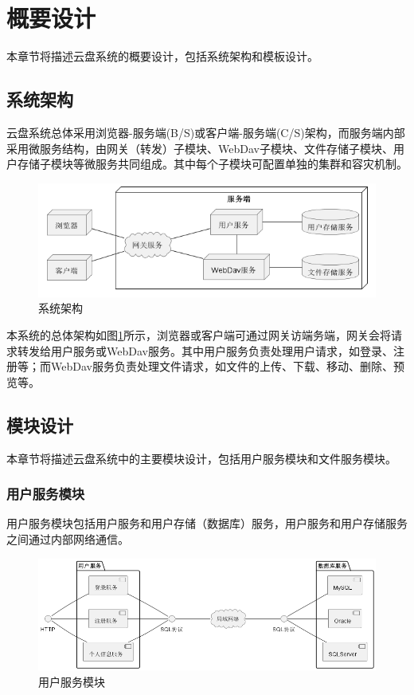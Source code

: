 \section{概要设计}

本章节将描述云盘系统的概要设计，包括系统架构和模板设计。

\subsection{系统架构}

云盘系统总体采用浏览器-服务端(B/S)或客户端-服务端(C/S)架构，而服务端内部采用微服务结构，由网关（转发）子模块、WebDav子模块、文件存储子模块、用户存储子模块等微服务共同组成。其中每个子模块可配置单独的集群和容灾机制。

\begin{figure}[H]
    \centering
    \includegraphics[scale=0.55]{examples/系统架构图.png}
    \caption{系统架构}
    \label{fig:sysarch}
\end{figure}

本系统的总体架构如图\ref{fig:sysarch}所示，浏览器或客户端可通过网关访端务端，网关会将请求转发给用户服务或WebDav服务。其中用户服务负责处理用户请求，如登录、注册等；而WebDav服务负责处理文件请求，如文件的上传、下载、移动、删除、预览等。

\subsection{模块设计}

本章节将描述云盘系统中的主要模块设计，包括用户服务模块和文件服务模块。

\subsubsection{用户服务模块}

用户服务模块包括用户服务和用户存储（数据库）服务，用户服务和用户存储服务之间通过内部网络通信。

\begin{figure}[H]
    \centering
    \includegraphics[scale=0.4]{examples/用户服务模块.png}
    \caption{用户服务模块}
    \label{fig:usersrv}
\end{figure}

